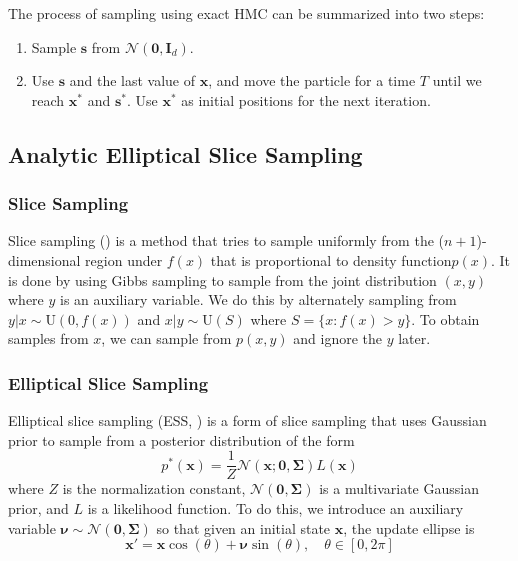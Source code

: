 \documentclass{scrartcl}
\numberwithin{equation}{section}
\begin{document}
The process of sampling using exact HMC can be summarized into two steps:   
\begin{enumerate}
	\item Sample $\textbf{s}$ from $\mathcal{N}(\textbf{0}, \textbf{I}_d)$.
	\item Use $\textbf{s}$ and the last value of $\textbf{x}$, and move the particle for a time $T$ until we reach $\textbf{x}^*$ and $\textbf{s}^*$. Use $\textbf{x}^*$ as initial positions for the next iteration.
\end{enumerate}

\subsection{Analytic Elliptical Slice Sampling}   
\subsubsection{Slice Sampling}
Slice sampling (\cite{Neal2003}) is a method that tries to sample uniformly from the ($n+1$)-dimensional region under $f(x)$ that is proportional to density function$p(x)$. It is done by using Gibbs sampling to sample from the joint distribution $(x, y)$ where $y$ is an auxiliary variable. We do this by alternately sampling from $y|x \sim \text{U}(0, f(x))$ and $x|y \sim \text{U}(S)$ where $S = \{x: f(x)>y\}$. To obtain samples from $x$, we can sample from $p(x,y)$ and ignore the $y$ later.   

\subsubsection{Elliptical Slice Sampling}
Elliptical slice sampling (ESS, \cite{murray2010}) is a form of slice sampling that uses Gaussian prior to sample from a posterior distribution of the form
\begin{equation}\label{eq:ESSpost}
	p^*(\textbf{x}) = \frac1Z\mathcal{N}(\textbf{x};\textbf{0}, \boldsymbol{\Sigma}) L(\textbf{x})
\end{equation}
where $Z$ is the normalization constant, $\mathcal{N}(\textbf{0},\boldsymbol{\Sigma})$ is a multivariate Gaussian prior, and $L$ is a likelihood function. To do this, we introduce an auxiliary variable $\boldsymbol{\nu} \sim \mathcal{N}(\textbf{0}, \boldsymbol{\Sigma})$ so that given an initial state $\textbf{x}$, the update ellipse is   
\begin{equation}\label{eq:rule}
	\textbf{x}' = \textbf{x}\cos(\theta) + \boldsymbol{\nu}\sin(\theta), \quad  \theta \in [0, 2\pi]
\end{equation}   
\end{document}
